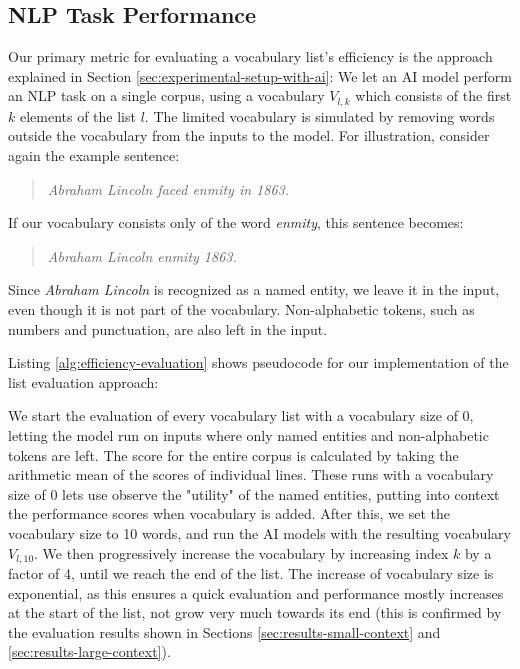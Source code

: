 \subsection{NLP Task Performance} \label{sec:task-performance-measure}
Our primary metric for evaluating a vocabulary list's efficiency is the approach explained in Section \ref{sec:experimental-setup-with-ai}:
We let an AI model perform an NLP task on a single corpus, using a vocabulary $V_{l, k}$ which consists of the first $k$ elements of the list $l$.
The limited vocabulary is simulated by removing words outside the vocabulary from the inputs to the model.
For illustration, consider again the example sentence:

\begin{quote}
	\textit{Abraham Lincoln faced enmity in 1863.}
\end{quote}

If our vocabulary consists only of the word \textit{enmity}, this sentence becomes:

\begin{quote}
	\textit{Abraham Lincoln enmity 1863.}
\end{quote}

Since \textit{Abraham Lincoln} is recognized as a named entity, we leave it in the input, even though it is not part of the vocabulary.
Non-alphabetic tokens, such as numbers and punctuation, are also left in the input.

Listing \ref{alg:efficiency-evaluation} shows pseudocode for our implementation of the list evaluation approach:



We start the evaluation of every vocabulary list with a vocabulary size of 0, letting the model run on inputs where only named entities and non-alphabetic tokens are left.
The score for the entire corpus is calculated by taking the arithmetic mean of the scores of individual lines.
These runs with a vocabulary size of 0 lets use observe the "utility" of the named entities, putting into context the performance scores when vocabulary is added.
After this, we set the vocabulary size to 10 words, and run the AI models with the resulting vocabulary $V_{l, 10}$.
We then progressively increase the vocabulary by increasing index $k$ by a factor of 4, until we reach the end of the list.
The increase of vocabulary size is exponential, as this ensures a quick evaluation and performance mostly increases at the start of the list, not grow very much towards its end (this is confirmed by the evaluation results shown in Sections \ref{sec:results-small-context} and \ref{sec:results-large-context}).


